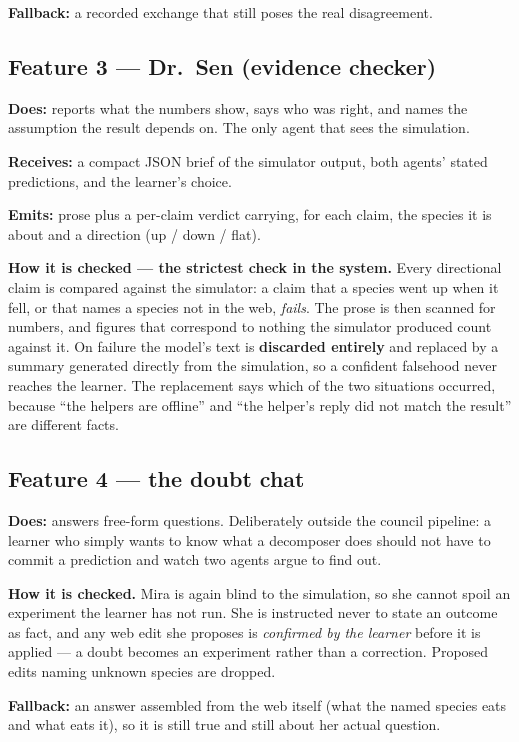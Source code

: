 \documentclass[11pt,a4paper]{article}
\begin{document}
\textbf{Fallback:} a recorded exchange that still poses the real disagreement.

\subsection*{Feature 3 --- Dr.\ Sen (evidence checker)}

\textbf{Does:} reports what the numbers show, says who was right, and names the assumption the
result depends on. The only agent that sees the simulation.

\textbf{Receives:} a compact JSON brief of the simulator output, both agents' stated predictions,
and the learner's choice.

\textbf{Emits:} prose plus a per-claim verdict carrying, for each claim, the species it is about
and a direction (up / down / flat).

\textbf{How it is checked --- the strictest check in the system.} Every directional claim is
compared against the simulator: a claim that a species went up when it fell, or that names a
species not in the web, \emph{fails}. The prose is then scanned for numbers, and figures that
correspond to nothing the simulator produced count against it. On failure the model's text is
\textbf{discarded entirely} and replaced by a summary generated directly from the simulation, so
a confident falsehood never reaches the learner. The replacement says which of the two situations
occurred, because ``the helpers are offline'' and ``the helper's reply did not match the result''
are different facts.

\subsection*{Feature 4 --- the doubt chat}

\textbf{Does:} answers free-form questions. Deliberately outside the council pipeline: a learner
who simply wants to know what a decomposer does should not have to commit a prediction and watch
two agents argue to find out.

\textbf{How it is checked.} Mira is again blind to the simulation, so she cannot spoil an
experiment the learner has not run. She is instructed never to state an outcome as fact, and any
web edit she proposes is \emph{confirmed by the learner} before it is applied --- a doubt becomes
an experiment rather than a correction. Proposed edits naming unknown species are dropped.

\textbf{Fallback:} an answer assembled from the web itself (what the named species eats and what
eats it), so it is still true and still about her actual question.
\end{document}
